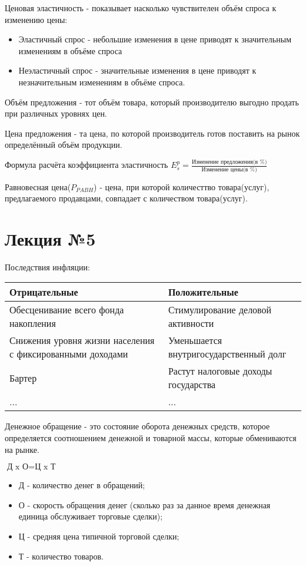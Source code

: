 \documentclass[a4paper, 12pt]{article}
\begin{document}
	Ценовая эластичность - показывает насколько чувствителен объём спроса к изменению цены:
	\begin{itemize}
		\item Эластичный спрос - небольшие изменения в цене приводят к значительным изменениям в объёме спроса
		\item Неэластичный спрос - значительные изменения в цене приводят к незначительным изменениям в объёме спроса.
	\end{itemize}

	Объём предложения - тот объём товара, который производителю выгодно продать при различных уровнях цен.
	
	Цена предложения - та цена, по которой производитель готов поставить на рынок определённый объём продукции.
	
	Формула расчёта коэффициента эластичность $E^p_s = \frac{\text{Изменение предложения(в \%)}}{\text{Изменение цены(в \%)}}$
	
	Равновесная цена($P_{PABH}$) - цена, при которой количесттво товара(услуг), предлагаемого продавцами, совпадает с количеством товара(услуг).
	
	\part*{Лекция №5}
	
	Последствия инфляции:
	\begin{center}
		\begin{tabular}{ | m{10em} | m{10em} | }
			\hline
			Отрицательные & Положительные \\
			\hline
			Обесценивание всего фонда накопления & Стимулирование деловой активности \\
			\hline
			Снижения уровня жизни населения с фиксированными доходами & Уменьшается внутригосударственный долг \\
			\hline
			Бартер & Растут налоговые доходы государства \\
			\hline
			... & ... \\
			\hline
		\end{tabular}
	\end{center}

	Денежное обращение - это состояние оборота денежных средств, которое определяется соотношением денежной и товарной массы, которые обмениваются на рынке.
	
	$\text{Д x О} = \text{Ц x Т}$
	
	\begin{itemize}
		\item Д - количество денег в обращений;
		\item О - скорость обращения денег (сколько раз за данное время денежная единица обслуживает торговые сделки);
		\item Ц - средняя цена типичной торговой сделки;
		\item Т - количество товаров.
	\end{itemize}
\end{document}
